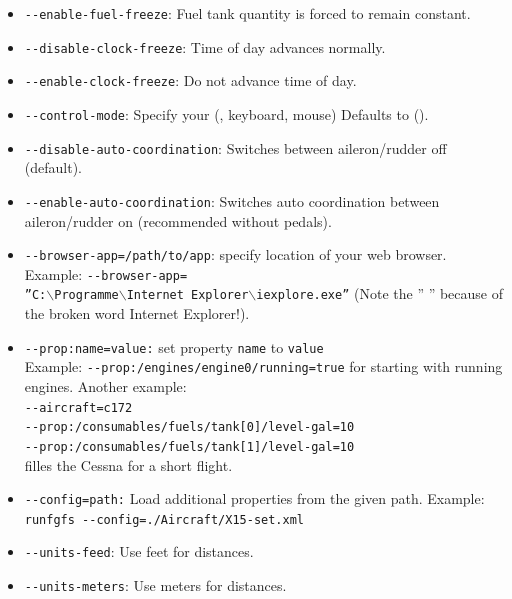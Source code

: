 \begin{itemize}
\item{\texttt{-$ $-enable-fuel-freeze}}: Fuel tank quantity is forced to remain constant.
\item{\texttt{-$ $-disable-clock-freeze}}: Time of day advances normally.
\item{\texttt{-$ $-enable-clock-freeze}}: Do not advance time of day.
\item{\texttt{-$ $-control-mode}}: Specify your  (,
 keyboard, mouse) Defaults to  ().
\item{\texttt{-$ $-disable-auto-coordination}}: Switches  between
aileron/rudder off (default).
\item{\texttt{-$ $-enable-auto-coordination}}: Switches auto coordination between
aileron/rudder on (recommended without pedals).
\item{\texttt{-$ $-browser-app=/path/to/app}}:  specify location of your web browser. Example:
\texttt{-$ $-browser-app=}\\  \texttt{''C:$\backslash$Programme$\backslash$Internet~Explorer$\backslash$iexplore.exe''} (Note the '' '' because of the broken word Internet Explorer!).
\item{\texttt{-$ $-prop:name=value:}}  set property \texttt{name} to \texttt{value}\\Example:
\texttt{-$ $-prop:/engines/engine0/running=true} for starting with running engines. Another example:\\
\texttt{-$ $-aircraft=c172}\\
\texttt{-$ $-prop:/consumables/fuels/tank[0]/level-gal=10}\\
\texttt{-$ $-prop:/consumables/fuels/tank[1]/level-gal=10}\\
filles the Cessna for a short flight.
\item{\texttt{-$ $-config=path:}}  Load additional properties from the given path. Example: \texttt{runfgfs -$ $-config=./Aircraft/X15-set.xml}
\item{\texttt{-$ $-units-feed}}: Use feet for distances.
\item{\texttt{-$ $-units-meters}}: Use meters for distances.
\end{itemize}
